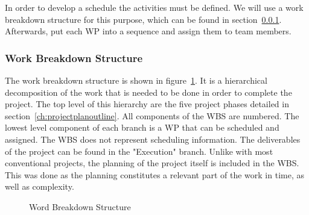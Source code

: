In order to develop a schedule the activities must be defined. We will use a work breakdown structure for this purpose, which can be found in section~\ref{ch:wbs}. Afterwards, put each \ac{WP} into a sequence and assign them to team members.

\subsubsection{Work Breakdown Structure}
\label{ch:wbs}

The work breakdown structure is shown in figure~\ref{fig:wbs}. It is a hierarchical decomposition of the work that is needed to be done in order to complete the project. The top level of this hierarchy are the five project phases detailed in section~\ref{ch:projectplanoutline}. All components of the \ac{WBS} are numbered. The lowest level component of each branch is a \ac{WP} that can be scheduled and assigned. The \ac{WBS} does not represent scheduling information. The deliverables of the project can be found in the "Execution" branch. Unlike with most conventional projects, the planning of the project itself is included in the \ac{WBS}. This was done as the planning constitutes a relevant part of the work in time, as well as complexity.

\begin{figure}
  \caption{Word Breakdown Structure}
  \label{fig:wbs}
\end{figure}


